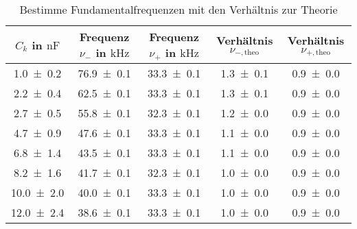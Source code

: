 \begin{table} 
\centering 
\caption{ Bestimme Fundamentalfrequenzen mit den Verhältnis zur Theorie} 
\label{teilb_schwingungen_prak_theo} 
\begin{tabular}{S S S S S } 
\toprule  
{$C_k$ in $\si{\nano\farad}$} & {Frequenz $\nu_-$ in $\si{\kilo\hertz}$} & {Frequenz $\nu_+$ in $\si{\kilo\hertz}$ }& {Verhältnis $\nu_{-,\mathup{theo}}$} & {Verhältnis $\nu_{+,\mathup{theo}}$}  \\ 
\midrule  
 \num{1.0\pm0.2} & \num{76.9\pm0.1} & \num{33.3\pm0.1} & \num{1.3\pm0.1} & \num{0.9\pm0.0}\\ 
\num{2.2\pm0.4} & \num{62.5\pm0.1} & \num{33.3\pm0.1} & \num{1.3\pm0.1} & \num{0.9\pm0.0}\\ 
\num{2.7\pm0.5} & \num{55.8\pm0.1} & \num{32.3\pm0.1} & \num{1.2\pm0.0} & \num{0.9\pm0.0}\\ 
\num{4.7\pm0.9} & \num{47.6\pm0.1} & \num{33.3\pm0.1} & \num{1.1\pm0.0} & \num{0.9\pm0.0}\\ 
\num{6.8\pm1.4} & \num{43.5\pm0.1} & \num{33.3\pm0.1} & \num{1.1\pm0.0} & \num{0.9\pm0.0}\\ 
\num{8.2\pm1.6} & \num{41.7\pm0.1} & \num{32.3\pm0.1} & \num{1.0\pm0.0} & \num{0.9\pm0.0}\\ 
\num{10.0\pm2.0} & \num{40.0\pm0.1} & \num{33.3\pm0.1} & \num{1.0\pm0.0} & \num{0.9\pm0.0}\\ 
\num{12.0\pm2.4} & \num{38.6\pm0.1} & \num{33.3\pm0.1} & \num{1.0\pm0.0} & \num{0.9\pm0.0}\\ 
\bottomrule 
\end{tabular} 
\end{table}
